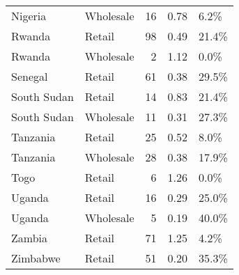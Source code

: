 \begin{table}[ht]
\begin{tabular}{llrrl}
  Nigeria & Wholesale &  16 & 0.78 & 6.2\% \\ 
  Rwanda & Retail &  98 & 0.49 & 21.4\% \\ 
  Rwanda & Wholesale &   2 & 1.12 & 0.0\% \\ 
  Senegal & Retail &  61 & 0.38 & 29.5\% \\ 
  South Sudan & Retail &  14 & 0.83 & 21.4\% \\ 
  South Sudan & Wholesale &  11 & 0.31 & 27.3\% \\ 
  Tanzania & Retail &  25 & 0.52 & 8.0\% \\ 
  Tanzania & Wholesale &  28 & 0.38 & 17.9\% \\ 
  Togo & Retail &   6 & 1.26 & 0.0\% \\ 
  Uganda & Retail &  16 & 0.29 & 25.0\% \\ 
  Uganda & Wholesale &   5 & 0.19 & 40.0\% \\ 
  Zambia & Retail &  71 & 1.25 & 4.2\% \\ 
  Zimbabwe & Retail &  51 & 0.20 & 35.3\% \\ 
   \hline
\end{tabular}
\end{table}
